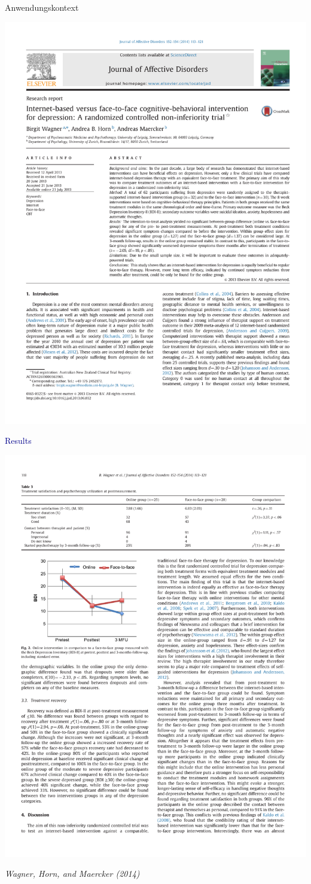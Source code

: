 \documentclass[
  8pt,
  ignorenonframetext,
]{beamer}
\begin{document}
\begin{frame}[t]{Anwendungskontext}
\protect\hypertarget{anwendungskontext-12}{}
\begin{center}\includegraphics[width=0.5\linewidth]{8_Abbildungen/alm_8_article_title} \end{center}
\center

\textcolor{darkblue}{Results}

\begin{center}\includegraphics[width=0.55\linewidth]{8_Abbildungen/alm_8_article_results} \end{center}
\flushright
\footnotesize

\emph{Wagner, Horn, and Maercker (2014)}
\end{frame}
\end{document}
